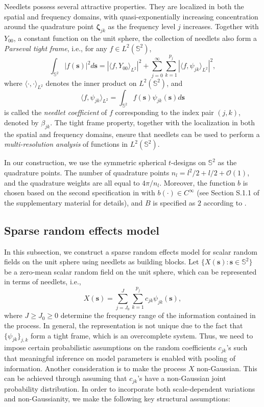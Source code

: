 \documentclass[aoas,preprint]{imsart}
\numberwithin{equation}{section}
\theoremstyle{plain}
\begin{document}
Needlets possess several attractive properties. They are localized in both the spatial and frequency domains, with
quasi-exponentially increasing concentration around the quadrature point $\bm{\zeta}_{jk}$ as the frequency level $j$ increases.
Together with $Y_{00}$, a constant function on the unit sphere, the collection of needlets also form a
\textit{Parseval tight frame}, i.e., for any  $f \in L^2(\mathbb{S}^2)$,
$$\int_{\mathbb{S}^2} |f(\mathbf{s})|^2 d\mathbf{s} = |\langle f,Y_{00}\rangle_{L^2}|^2 + \sum_{j=0}^\infty \sum_{k=1}^{p_j} |\langle f,\psi_{jk}\rangle_{L^2}|^2,$$
where $\langle \cdot,\cdot \rangle_{L^2}$ denotes the inner product on $L^2(\mathbb{S}^2)$, and
$$\langle f,\psi_{jk}\rangle_{L^2} = \int_{\mathbb{S}^2} f(\mathbf{s}) \psi_{jk}(\mathbf{s})d\mathbf{s}$$ is called the
\textit{needlet coefficient} of $f$ corresponding to the index pair $(j, k)$, denoted by $\beta_{jk}$. The tight frame property, together with the localization in both the spatial and frequency domains, ensure that needlets can be used to perform a \textit{multi-resolution analysis} of functions in $L^2(\mathbb{S}^2)$. 

In our construction, we use the symmetric spherical $t$-designs on $\mathbb{S}^2$ \citep{Womersley-15} as the quadrature points. The number of quadrature points $n_l=l^2/2+l/2+\mathcal{O}(1)$, and the quadrature weights are all equal to $4\pi/n_l$. Moreover, the function $b$ is chosen based on the second specification in \citet[Chapter 10.2.2]{Marinucci2011} with $b(\cdot) \in C^{\infty}$ (see Section S.1.1 of the supplementary material \citet{Fan-17-supp} for details), and $B$ is specified as $2$ according to \citet{Narcowich-etal06}.

\subsection{Sparse random effects model}\label{sec:spa_rand_eff}

In this subsection, we construct a sparse random effects model for scalar random fields on the unit sphere using needlets as building blocks. Let $\{X(\textbf{s}): \textbf{s}\in \mathbb{S}^2\}$ be a zero-mean scalar random field on the unit sphere, which can be represented in terms of needlets, i.e., 
\begin{equation}\label{w_comp}
X(\textbf{s})=\sum \limits_{j=J_0}^{J} \sum \limits_{k=1}^{p_j} c_{jk}\psi_{jk}(\textbf{s}),
\end{equation}
where $J\geq J_0 \geq 0$ determine the frequency range of the information contained in the process. In general, the representation is not unique due to the fact that $\{\psi_{jk} \}_{j,k}$ form a tight frame, which is an overcomplete system. Thus, we need to impose certain probabilistic assumptions on the random coefficients $c_{jk}$'s such that meaningful inference on model parameters is enabled with pooling of information. Another consideration is to make the process $X$ non-Gaussian. This can be achieved through assuming that 
$c_{jk}$'s have a non-Gaussian joint probability distribution. In order to incorporate both scale-dependent variations and non-Gaussianity, we make the following key structural assumptions:
\end{document}
